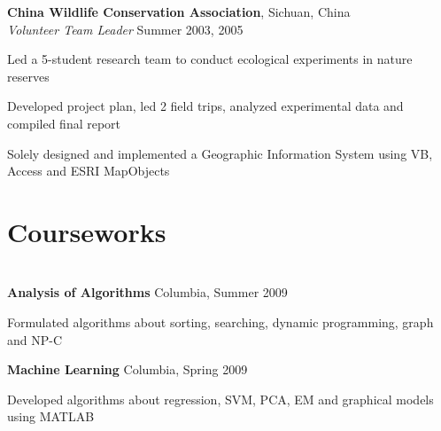 \documentclass[margin,line]{resume}
\begin{document}
\begin{resume}
    \textbf{China Wildlife Conservation Association}, Sichuan, China \\
    \textsl{Volunteer Team Leader} \hfill Summer 2003, 2005  \vspace{-3mm}\\\vspace{-1mm}%
      \begin{list2}
      \item Led a 5-student research team to conduct ecological experiments in nature reserves 
      \item Developed project plan, led 2 field trips, analyzed experimental data and compiled final report 
      \item Solely designed and implemented a Geographic Information System using VB, Access and ESRI MapObjects 
      \end{list2}

    \section{\mysidestyle Courseworks}

    \section{\mysidestyle [Algorithm]}

    \textbf{Analysis of Algorithms} \hfill Columbia, Summer 2009 \vspace{-3mm}\\\vspace{-1mm}%
      \begin{list2}
      \item Formulated algorithms about sorting, searching, dynamic programming, graph and NP-C
      \end{list2}
    
    \textbf{Machine Learning} \hfill Columbia, Spring 2009 \vspace{-3mm}\\\vspace{-1mm}%
      \begin{list2}
      \item Developed algorithms about regression, SVM, PCA, EM and graphical models using MATLAB 
      \end{list2}


\end{resume}
\end{document}
